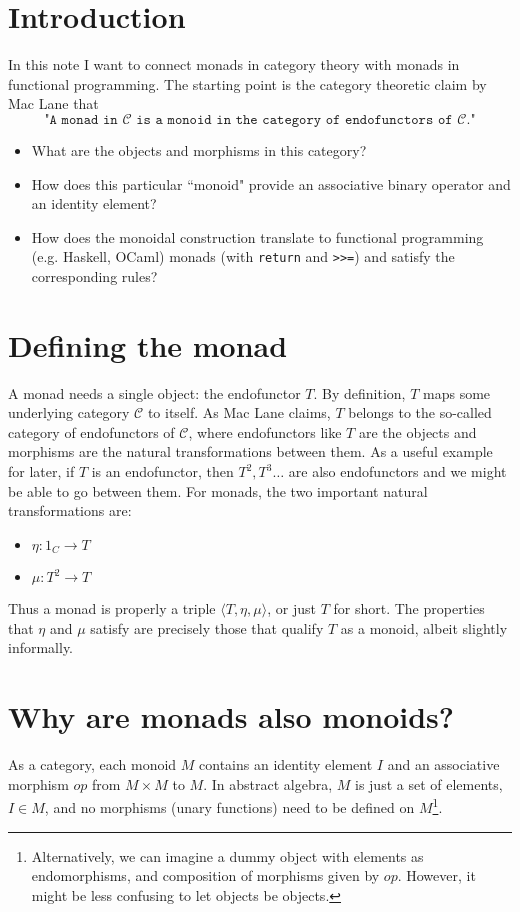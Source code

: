 \documentclass[11pt]{article}
\newcommand{\Cc}{\mathcal{C}}
\newcommand{\la}{\langle}
\newcommand{\ra}{\rangle}
\begin{document}
\section{Introduction}
In this note I want to connect monads in category theory with monads in functional programming. The starting point is the category theoretic claim by Mac Lane that \[\texttt{"A monad in $\Cc$ is a monoid in the category of endofunctors of $\Cc$."}\]
\begin{itemize}
    \item What are the objects and morphisms in this category?
    \item How does this particular ``monoid" provide an associative binary operator and an identity element?
    \item How does the monoidal construction translate to functional programming (e.g. Haskell, OCaml) monads (with \texttt{return} and \texttt{>>=}) and satisfy the corresponding rules?
\end{itemize}

\section{Defining the monad}
A monad needs a single object: the endofunctor $T$. By definition, $T$ maps some underlying category $\Cc$ to itself. As Mac Lane claims, $T$ belongs to the so-called category of endofunctors of $\Cc$, where endofunctors like $T$ are the objects and morphisms are the natural transformations between them. As a useful example for later, if $T$ is an endofunctor, then $T^2, T^3 \dots$ are also endofunctors and we might be able to go between them. For monads, the two important natural transformations are:
\begin{itemize}
    \item $\eta: 1_C \rightarrow T$
    \item $\mu: T^2 \rightarrow T$
\end{itemize}
Thus a monad is properly a triple $\la T, \eta, \mu \ra$, or just $T$ for short. The properties that $\eta$ and $\mu$ satisfy are precisely those that qualify $T$ as a monoid, albeit slightly informally.

\section{Why are monads also monoids?}
As a category, each monoid $M$ contains an identity element $I$ and an associative morphism $\mathit{op}$ from $M \times M$ to $M$. In abstract algebra, $M$ is just a set of elements, $I \in M$, and no morphisms (unary functions) need to be defined on $M$\footnote{Alternatively, we can imagine a dummy object with elements as endomorphisms, and composition of morphisms given by $\mathit{op}$. However, it might be less confusing to let objects be objects.}.
\end{document}
